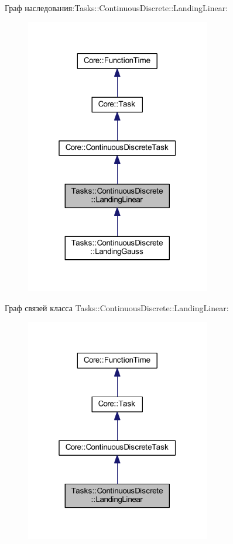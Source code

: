 Граф наследования\+:Tasks\+:\+:Continuous\+Discrete\+:\+:Landing\+Linear\+:
\nopagebreak
\begin{figure}[H]
\begin{center}
\leavevmode
\includegraphics[width=229pt]{class_tasks_1_1_continuous_discrete_1_1_landing_linear__inherit__graph}
\end{center}
\end{figure}


Граф связей класса Tasks\+:\+:Continuous\+Discrete\+:\+:Landing\+Linear\+:
\nopagebreak
\begin{figure}[H]
\begin{center}
\leavevmode
\includegraphics[width=229pt]{class_tasks_1_1_continuous_discrete_1_1_landing_linear__coll__graph}
\end{center}
\end{figure}


